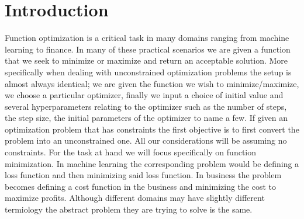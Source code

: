 \documentclass[12pt]{article}
\begin{document}





\fi 
\section{Introduction}
Function optimization is a critical task in many domains ranging from machine learning to finance. In many of these practical scenarios we are given a function that we seek to minimize or maximize and return an acceptable solution. More specifically when dealing with unconstrained optimization problems the setup is almost always identical; we are given the function we wish to minimize/maximize, we choose a particular optimizer, finally we input a choice of initial value and several hyperparameters relating to the optimizer such as the number of steps, the step size, the initial parameters of the optimizer to name a few. If given an optimization problem that has constraints the first objective is to first convert the problem into an unconstrained one. All our considerations will be assuming no constraints. For the task at hand we will focus specifically on function minimization. In machine learning the corresponding problem would be defining a loss function and then minimizing said loss function. In business the problem becomes defining a cost function in the business and minimizing the cost to maximize profits. Although different domains may have slightly different termiology the abstract problem they are trying to solve is the same.
\\
\end{document}
